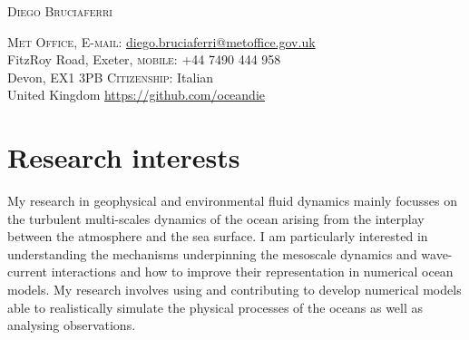 \documentclass[a4paper, oneside, final]{scrartcl}
\newcommand\YUGE{\fontsize{30}{60}\selectfont}
\begin{document}

\begin{center}
\YUGE \textsc{Diego Bruciaferri}\\
\end{center}
\bigskip%
\textsc{Met Office}, \hspace{6.2cm} \textsc{E-mail}: \href{mailto:diego.bruciaferri@metoffice.gov.uk}{diego.bruciaferri@metoffice.gov.uk}\\
FitzRoy Road, Exeter, \hspace{7.5cm} \textsc{mobile}: +44 7490 444 958\\
Devon, EX1 3PB \hspace{9.4cm} \textsc{Citizenship}: Italian\\
United Kingdom \hspace{7.6cm} \url{https://github.com/oceandie}\\

\section{Research interests}
\normalsize
\noindent
My research in geophysical and environmental fluid dynamics mainly focusses on the turbulent multi-scales dynamics of the ocean arising from the interplay between the atmosphere and the sea surface. I am particularly interested in understanding the mechanisms underpinning the mesoscale dynamics and wave-current interactions and how to improve their representation in numerical ocean models. My research involves using and contributing to develop numerical models able to realistically simulate the physical processes of the oceans as well as analysing observations. %
\end{document}
